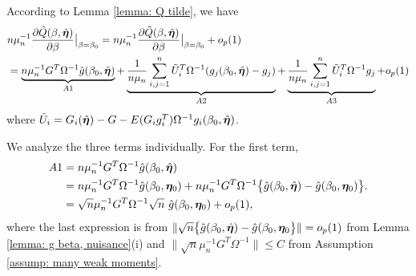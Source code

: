 \documentclass[12pt]{article}
\begin{document}
{%
%

According to Lemma \ref{lemma: Q tilde}, we have 
\begin{align*}
		&n \mu_n^{-1}\frac{\partial \hat{Q} (\beta, \hat {\bm \eta})}{\partial \beta}  \big|_{\beta= \beta_0}= n \mu_n^{-1}\frac{\partial \tilde{Q} (\beta, \hat {\bm \eta})}{\partial \beta}  \big|_{\beta= \beta_0}+o_p(1)\\
	&= \underbrace{n\mu_n^{-1} G^T \Omega^{-1} \hat{g} (\beta_0, \hat{\bm \eta})}_{A1} + \underbrace{\frac{1}{n\mu_n} \sum_{i,j=1}^n \tilde U_i^T \Omega^{-1} (g_j(\beta_0, \hat {\bm \eta}) - g_j)}_{A2} + \underbrace{\frac{1}{n\mu_n} \sum_{i,j=1}^n \tilde U_i^T \Omega^{-1} g_j}_{A3} +o_p(1)
\end{align*}
where $\tilde U_i= G_i( \hat{\bm \eta}) - G - E(G_i g_i^T) \Omega^{-1} g_i(\beta_0, \hat{\bm \eta})$.


We analyze the three terms individually. For the first term,
\begin{align*}
	A1&= n\mu_n^{-1} G^T \Omega^{-1} \hat{g} (\beta_0, \hat{\bm \eta})\\
	&=n\mu_n^{-1} G^T \Omega^{-1} \hat{g} (\beta_0, \bm \eta_0) + n \mu_n^{-1} G^T \Omega^{-1}\big\{\hat g(\beta_0, \hat {\bm \eta})- \hat g(\beta_0, \bm \eta_0)\big\}. \\
	&= \sqrt{n}\mu_n^{-1} G^T \Omega^{-1} \sqrt{n}\ \hat{g} (\beta_0, \bm \eta_0)+ o_p(1),
\end{align*}
where the last expression is from $ \| \sqrt{n} \big\{  \hat g(\beta_0, \hat {\bm \eta})- \hat g(\beta_0, \bm \eta_0\big\}  \| =o_p(1)$ from Lemma \ref{lemma: g beta, nuisance}(i)  and $  \| \sqrt{n}\mu_n^{-1} G^T\Omega^{-1} \| \leq C$ from Assumption \ref{assump: many weak moments}. 

}
\end{document}
